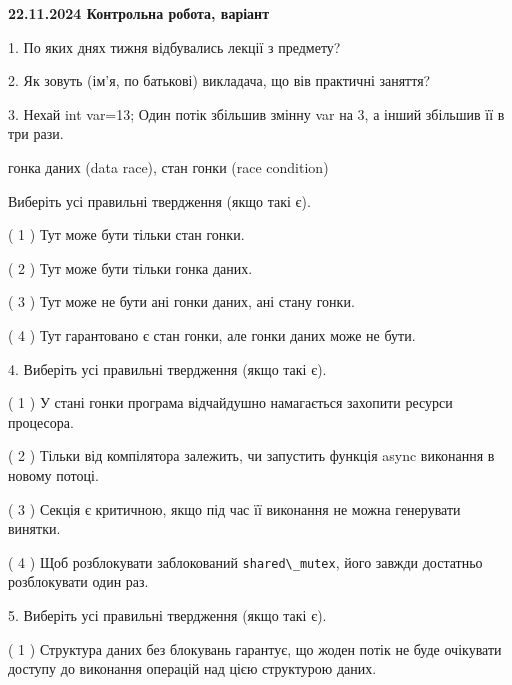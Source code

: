 \documentclass[12pt, ukrainian]{article}
\def\code#1{\Verb!#1!}
\begin{document}
\vspace{4mm}
\newpage
\begin {large}

\textbf{22.11.2024 Контрольна робота, варіант  }\par


{
1. По яких днях тижня відбувались лекції з предмету?



\vspace{5mm}
2. Як зовуть (ім'я, по батькові) викладача, що вів практичні заняття?



\vspace{5mm}
3. Нехай int var=13; Один потік збільшив змінну var на 3, а інший збільшив її в три рази.

гонка даних (data race), стан гонки (race condition)

Виберіть усі правильні твердження (якщо такі є).\par
\vspace{2mm}
( 1 ) Тут може бути тільки стан гонки.%

( 2 ) Тут може бути тільки гонка даних.%

( 3 ) Тут може не бути ані гонки даних, ані стану гонки.%

( 4 ) Тут гарантовано є стан гонки, але гонки даних може не бути.%


\vspace{5mm}
4. Виберіть усі правильні твердження (якщо такі є).\par
\vspace{2mm}

( 1 ) У стані гонки програма відчайдушно намагається захопити ресурси процесора.%

( 2 ) Тільки від компілятора залежить, чи запустить функція async виконання в новому потоці.%

( 3 ) Секція є критичною, якщо під час її виконання не можна генерувати винятки.%

( 4 ) Щоб розблокувати заблокований \code{shared\_mutex}, його завжди достатньо розблокувати один раз.%


\vspace{5mm}
5. Виберіть усі правильні твердження (якщо такі є).\par
\vspace{2mm}

( 1 ) Структура даних без блокувань гарантує, що жоден потік не буде очікувати доступу до виконання операцій над цією структурою даних.%

}
\end{large}
\end{document}
